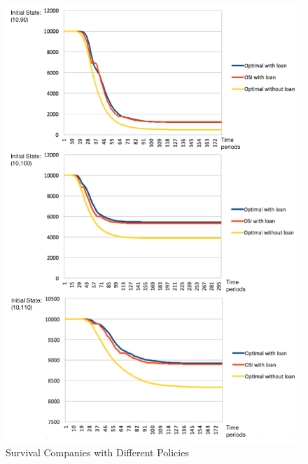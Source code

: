 \documentclass[12pt]{article}
\begin{document}
\begin{figure}
\begin{center}
\includegraphics[scale=.6]{OSI}
\end{center}
\caption{Survival Companies with Different Policies}
\label{OSI}
\end{figure}
\end{document}
